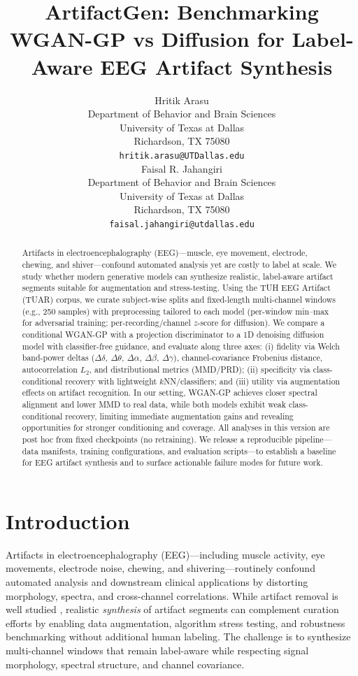 \documentclass{article}
\title{ArtifactGen: Benchmarking WGAN-GP vs Diffusion for Label-Aware EEG Artifact Synthesis}
\author{
  Hritik Arasu \\
  Department of Behavior and Brain Sciences\\
  University of Texas at Dallas\\
  Richardson, TX 75080 \\
  \texttt{hritik.arasu@UTDallas.edu} \\
  \And
  Faisal R. Jahangiri \\
  Department of Behavior and Brain Sciences\\
  University of Texas at Dallas\\
  Richardson, TX 75080 \\
  \texttt{faisal.jahangiri@utdallas.edu} \\
}
\begin{document}
\maketitle


\begin{abstract}
Artifacts in electroencephalography (EEG)---muscle, eye movement, electrode, chewing, and shiver---confound automated analysis yet are costly to label at scale. We study whether modern generative models can synthesize realistic, label-aware artifact segments suitable for augmentation and stress-testing. Using the TUH EEG Artifact (TUAR) corpus, we curate subject-wise splits and fixed-length multi-channel windows (e.g., 250 samples) with preprocessing tailored to each model (per-window min--max for adversarial training; per-recording/channel $z$-score for diffusion). We compare a conditional WGAN-GP with a projection discriminator to a 1D denoising diffusion model with classifier-free guidance, and evaluate along three axes: (i) fidelity via Welch band-power deltas ($\Delta\delta,\ \Delta\theta,\ \Delta\alpha,\ \Delta\beta,\ \Delta\gamma$), channel-covariance Frobenius distance, autocorrelation $L_2$, and distributional metrics (MMD/PRD); (ii) specificity via class-conditional recovery with lightweight $k$NN/classifiers; and (iii) utility via augmentation effects on artifact recognition. In our setting, WGAN-GP achieves closer spectral alignment and lower MMD to real data, while both models exhibit weak class-conditional recovery, limiting immediate augmentation gains and revealing opportunities for stronger conditioning and coverage. All analyses in this version are post hoc from fixed checkpoints (no retraining). We release a reproducible pipeline---data manifests, training configurations, and evaluation scripts---to establish a baseline for EEG artifact synthesis and to surface actionable failure modes for future work.
\end{abstract}


\section{Introduction}
Artifacts in electroencephalography (EEG)—including muscle activity, eye movements, electrode noise, chewing, and shivering—routinely confound automated analysis and downstream clinical applications by distorting morphology, spectra, and cross-channel correlations. While artifact removal is well studied \citep{uriguen2015eegartifact,jiang2019removalartifacts}, realistic \emph{synthesis} of artifact segments can complement curation efforts by enabling data augmentation, algorithm stress testing, and robustness benchmarking without additional human labeling. The challenge is to synthesize multi-channel windows that remain label-aware while respecting signal morphology, spectral structure, and channel covariance.
\end{document}
